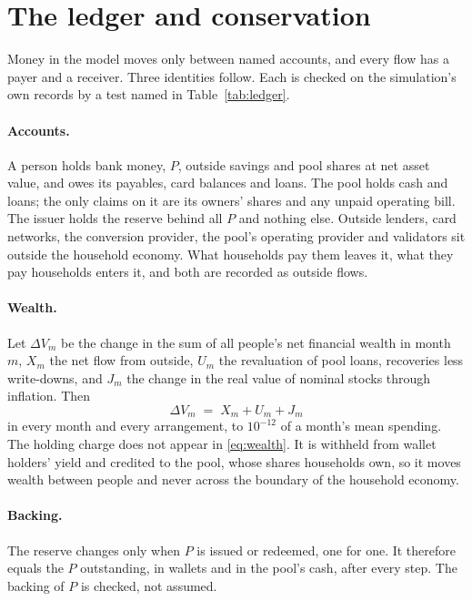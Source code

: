 \documentclass[10pt,a4paper]{article}
\theoremstyle{remark}
\let\savedsection\section
\renewcommand{\section}{\FloatBarrier\savedsection}
\begin{document}
\appendix
\section{The ledger and conservation}
\label{app:ledger}
Money in the model moves only between named accounts, and every flow has a
payer and a receiver. Three identities follow. Each is checked on the
simulation's own records by a test named in Table~\ref{tab:ledger}.

\paragraph{Accounts.}
A person holds bank money, \(P\), outside savings and pool shares at net asset
value, and owes its payables, card balances and loans. The pool holds
cash and loans; the only claims on it are its owners' shares and any
unpaid operating bill. The issuer holds the reserve behind all
\(P\) and nothing else. Outside lenders, card networks, the conversion
provider, the pool's operating provider and validators sit outside the
household economy. What households pay them leaves it, what they pay
households enters it, and both are recorded as outside flows.

\paragraph{Wealth.}
Let \(\Delta V_m\) be the change in the sum of all people's net financial
wealth in month \(m\), \(X_m\) the net flow from outside, \(U_m\) the
revaluation of pool loans, recoveries less write-downs, and \(J_m\) the change
in the real value of nominal stocks through inflation. Then
\begin{equation}
\Delta V_m \;=\; X_m+U_m+J_m
\label{eq:wealth}
\end{equation}
in every month and every arrangement, to \(10^{-12}\) of a month's mean
spending. The holding charge does not appear in \eqref{eq:wealth}. It is
withheld from wallet holders' yield and credited to the pool, whose shares
households own, so it moves wealth between people and never across the
boundary of the household economy.

\paragraph{Backing.}
The reserve changes only when \(P\) is issued or redeemed, one for one. It
therefore equals the \(P\) outstanding, in wallets and in the pool's
cash, after every step. The backing of \(P\) is checked, not assumed.
\end{document}
